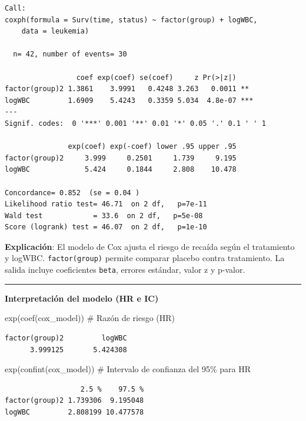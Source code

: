 \documentclass[
]{article}
\newenvironment{Shaded}{\begin{snugshade}}{\end{snugshade}}
\newcommand{\CommentTok}[1]{\textcolor[rgb]{0.37,0.37,0.37}{#1}}
\newcommand{\FunctionTok}[1]{\textcolor[rgb]{0.28,0.35,0.67}{#1}}
\newcommand{\NormalTok}[1]{\textcolor[rgb]{0.00,0.23,0.31}{#1}}
\begin{document}
\begin{verbatim}
Call:
coxph(formula = Surv(time, status) ~ factor(group) + logWBC, 
    data = leukemia)

  n= 42, number of events= 30 

                 coef exp(coef) se(coef)     z Pr(>|z|)    
factor(group)2 1.3861    3.9991   0.4248 3.263   0.0011 ** 
logWBC         1.6909    5.4243   0.3359 5.034  4.8e-07 ***
---
Signif. codes:  0 '***' 0.001 '**' 0.01 '*' 0.05 '.' 0.1 ' ' 1

               exp(coef) exp(-coef) lower .95 upper .95
factor(group)2     3.999     0.2501     1.739     9.195
logWBC             5.424     0.1844     2.808    10.478

Concordance= 0.852  (se = 0.04 )
Likelihood ratio test= 46.71  on 2 df,   p=7e-11
Wald test            = 33.6  on 2 df,   p=5e-08
Score (logrank) test = 46.07  on 2 df,   p=1e-10
\end{verbatim}

\textbf{Explicación}: El modelo de Cox ajusta el riesgo de recaída según
el tratamiento y logWBC. \texttt{factor(group)} permite comparar placebo
contra tratamiento. La salida incluye coeficientes \texttt{beta},
errores estándar, valor z y p-valor.

\begin{center}\rule{0.5\linewidth}{0.5pt}\end{center}

\textbf{Interpretación del modelo (HR e IC)}

\begin{Shaded}
\begin{Highlighting}[]
\FunctionTok{exp}\NormalTok{(}\FunctionTok{coef}\NormalTok{(cox\_model))       }\CommentTok{\# Razón de riesgo (HR)}
\end{Highlighting}
\end{Shaded}

\begin{verbatim}
factor(group)2         logWBC 
      3.999125       5.424308 
\end{verbatim}

\begin{Shaded}
\begin{Highlighting}[]
\FunctionTok{exp}\NormalTok{(}\FunctionTok{confint}\NormalTok{(cox\_model))    }\CommentTok{\# Intervalo de confianza del 95\% para HR}
\end{Highlighting}
\end{Shaded}

\begin{verbatim}
                  2.5 %    97.5 %
factor(group)2 1.739306  9.195048
logWBC         2.808199 10.477578
\end{verbatim}
\end{document}
